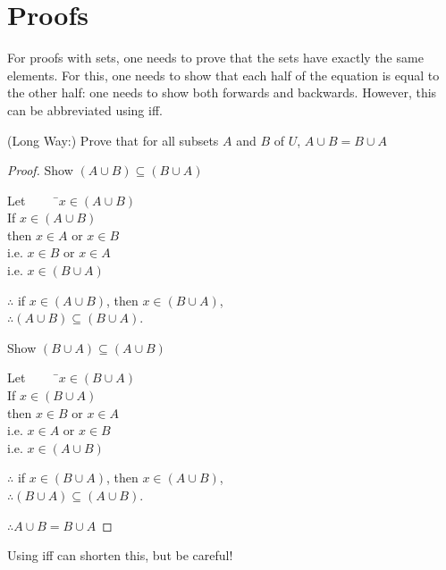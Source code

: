\documentclass[../notes.tex]{subfiles}
\begin{document}
		\section{Proofs}
			For proofs with sets, one needs to prove that the sets have exactly the same elements. For this, one needs to show that each half of the equation is equal to the other half: one needs to show both forwards and backwards. However, this can be abbreviated using iff.
			\begin{example}
				(Long Way:) Prove that for all subsets $A$ and $B$ of $U$, $A \cup B = B \cup A$
				\begin{proof}
					Show $(A \cup B) \subseteq (B \cup A)$
					\begin{tabbing}
						Let $\qquad$ \=$x \in (A \cup B)$\\
						If \>$x \in (A \cup B)$\\
						then \> $x \in A$ or $x \in B$\\
						i.e. \> $x \in B$ or $x \in A$\\
						i.e. \> $x \in (B \cup A)$
					\end{tabbing}
					$\therefore$ if $x \in (A \cup B)$, then $x \in (B \cup A)$,\\
					$\therefore (A \cup B) \subseteq (B \cup A)$.

					\vspace{7mm}
					Show $(B \cup A) \subseteq (A \cup B)$
					\begin{tabbing}
						Let $\qquad$ \=$x \in (B \cup A)$\\
						If \>$x \in (B \cup A)$\\
						then \> $x \in B$ or $x \in A$\\
						i.e. \> $x \in A$ or $x \in B$\\
						i.e. \> $x \in (A \cup B)$
					\end{tabbing}
					$\therefore$ if $x \in (B \cup A)$, then $x \in (A \cup B)$,\\
					$\therefore (B \cup A) \subseteq (A \cup B)$.

					\vspace{5mm}
					$\therefore A \cup B = B \cup A$
				\end{proof}
			\end{example}
			Using iff can shorten this, but be careful!
\end{document}
